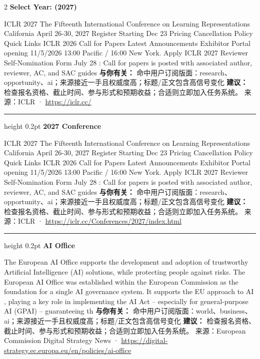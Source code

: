 \documentclass[10.5pt]{ctexart}
\begin{document}
\begin{multicols}{2}
{\large\bfseries Select Year: (2027)}\par
ICLR 2027 The Fifteenth International Conference on Learning Representations California April 26-30, 2027 Register Starting Dec 23 Pricing Cancellation Policy Quick Links ICLR 2026 Call for Papers Latest Announcements Exhibitor Portal opening 11/5/2026 13:00 Pacific / 16:00 New York. Apply ICLR 2027 Reviewer Self-Nomination Form July 28 : Call for papers is posted with associated author, reviewer, AC, and SAC guides 
\textbf{与你有关：} 命中用户订阅版面：research、opportunity、ai；来源接近一手且权威度高；标题/正文包含高信号变化
\textbf{建议：} 检查报名资格、截止时间、参与形式和预期收益；合适则立即加入任务系统。
{\footnotesize\color{ormuted} 来源：ICLR · \url{https://iclr.cc/}}
\vspace{2mm}
\hrule height 0.2pt
\vspace{2mm}
{\large\bfseries 2027 Conference}\par
ICLR 2027 The Fifteenth International Conference on Learning Representations California April 26-30, 2027 Register Starting Dec 23 Pricing Cancellation Policy Quick Links ICLR 2026 Call for Papers Latest Announcements Exhibitor Portal opening 11/5/2026 13:00 Pacific / 16:00 New York. Apply ICLR 2027 Reviewer Self-Nomination Form July 28 : Call for papers is posted with associated author, reviewer, AC, and SAC guides 
\textbf{与你有关：} 命中用户订阅版面：research、opportunity、ai；来源接近一手且权威度高；标题/正文包含高信号变化
\textbf{建议：} 检查报名资格、截止时间、参与形式和预期收益；合适则立即加入任务系统。
{\footnotesize\color{ormuted} 来源：ICLR · \url{https://iclr.cc/Conferences/2027/index.html}}
\vspace{2mm}
\hrule height 0.2pt
\vspace{2mm}
{\large\bfseries AI Office}\par
The European AI Office supports the development and adoption of trustworthy Artificial Intelligence (AI) solutions, while protecting people against risks. The European AI Office was established within the European Commission as the foundation for a single AI governance system. It supports the EU approach to AI , playing a key role in implementing the AI Act – especially for general-purpose AI (GPAI) – guaranteeing th
\textbf{与你有关：} 命中用户订阅版面：world、business、ai；来源接近一手且权威度高；标题/正文包含高信号变化
\textbf{建议：} 检查报名资格、截止时间、参与形式和预期收益；合适则立即加入任务系统。
{\footnotesize\color{ormuted} 来源：European Commission Digital Strategy News · \url{https://digital-strategy.ec.europa.eu/en/policies/ai-office}}

\end{multicols}
\end{document}
